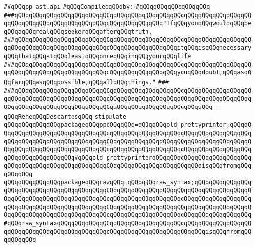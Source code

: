 \label{src/lib/c-kit/src/ast/prettyprint/pp-ast.api}
\verb|##qQQqpp-ast.api|\newline
\newline
\verb|#qQQqCompiledqQQqby:|\newline
\verb|#qQQqqQQqqQQqqQQqqQQq|\newline
\newline
\verb|###qQQqqQQqqQQqqQQqqQQqqQQqqQQqqQQqqQQqqQQqqQQqqQQqqQQqqQQqqQQqqQQqqQQqqQQqqQQqqQQqqQQqqQQqqQQqqQQqqQQqqQQqqQQqqQQq"IfqQQqyouqQQqwouldqQQqbeqQQqaqQQqrealqQQqseekerqQQqafterqQQqtruth,|\newline
\verb|###qQQqqQQqqQQqqQQqqQQqqQQqqQQqqQQqqQQqqQQqqQQqqQQqqQQqqQQqqQQqqQQqqQQqqQQqqQQqqQQqqQQqqQQqqQQqqQQqqQQqqQQqqQQqqQQqqQQqitqQQqisqQQqnecessaryqQQqthatqQQqatqQQqleastqQQqonceqQQqinqQQqyourqQQqlife|\newline
\verb|###qQQqqQQqqQQqqQQqqQQqqQQqqQQqqQQqqQQqqQQqqQQqqQQqqQQqqQQqqQQqqQQqqQQqqQQqqQQqqQQqqQQqqQQqqQQqqQQqqQQqqQQqqQQqqQQqqQQqyouqQQqdoubt,qQQqasqQQqfarqQQqasqQQqpossible,qQQqallqQQqthings."|\newline
\verb|###|\newline
\verb|###qQQqqQQqqQQqqQQqqQQqqQQqqQQqqQQqqQQqqQQqqQQqqQQqqQQqqQQqqQQqqQQqqQQqqQQqqQQqqQQqqQQqqQQqqQQqqQQqqQQqqQQqqQQqqQQqqQQqqQQqqQQqqQQqqQQqqQQqqQQqqQQqqQQqqQQqqQQqqQQqqQQqqQQqqQQqqQQqqQQqqQQqqQQqqQQqqQQq--qQQqReneqQQqDescartesqQQq|\newline
\newline
\verb|stipulate|\newline
\verb|qQQqqQQqqQQqqQQqpackageqQQqppqQQqqQQq=qQQqqQQqold_prettyprinter;qQQqqQQqqQQqqQQqqQQqqQQqqQQqqQQqqQQqqQQqqQQqqQQqqQQqqQQqqQQqqQQqqQQqqQQqqQQqqQQqqQQqqQQqqQQqqQQqqQQqqQQqqQQqqQQqqQQqqQQqqQQqqQQqqQQqqQQqqQQqqQQqqQQqqQQqqQQqqQQqqQQqqQQqqQQqqQQqqQQqqQQqqQQqqQQqqQQqqQQqqQQqqQQqqQQqqQQqqQQqqQQqqQQqqQQqqQQq#qQQqold_prettyprinterqQQqqQQqqQQqqQQqqQQqqQQqqQQqqQQqqQQqqQQqqQQqqQQqqQQqqQQqqQQqqQQqqQQqqQQqqQQqqQQqqQQqisqQQqfromqQQqqQQqqQQq|\newline
\verb|qQQqqQQqqQQqqQQqpackageqQQqrawqQQq=qQQqqQQqraw_syntax;qQQqqQQqqQQqqQQqqQQqqQQqqQQqqQQqqQQqqQQqqQQqqQQqqQQqqQQqqQQqqQQqqQQqqQQqqQQqqQQqqQQqqQQqqQQqqQQqqQQqqQQqqQQqqQQqqQQqqQQqqQQqqQQqqQQqqQQqqQQqqQQqqQQqqQQqqQQqqQQqqQQqqQQqqQQqqQQqqQQqqQQqqQQqqQQqqQQqqQQqqQQqqQQqqQQqqQQqqQQqqQQqqQQqqQQqqQQqqQQqqQQqqQQqqQQqqQQqqQQqqQQqqQQqqQQqqQQqqQQqqQQqqQQqqQQqqQQq#qQQqraw_syntaxqQQqqQQqqQQqqQQqqQQqqQQqqQQqqQQqqQQqqQQqqQQqqQQqqQQqqQQqqQQqqQQqqQQqqQQqqQQqqQQqqQQqqQQqqQQqqQQqqQQqqQQqqQQqqQQqisqQQqfromqQQqqQQqqQQq|\newline
